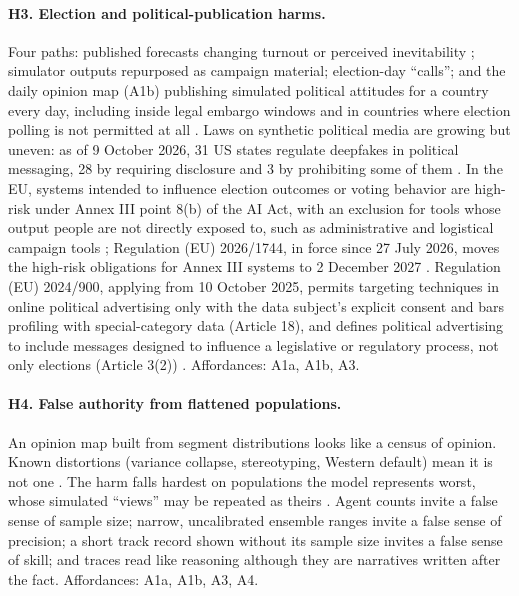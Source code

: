\documentclass[11pt]{article}
\begin{document}
\paragraph{H3. Election and political-publication harms.} Four paths: published forecasts changing turnout or perceived inevitability \citep{westwood2020projecting,perdomo2020performative,simon1954bandwagon}; simulator outputs repurposed as campaign material; election-day ``calls''; and the daily opinion map (A1b) publishing simulated political attitudes for a country every day, including inside legal embargo windows and in countries where election polling is not permitted at all \citep{esomarwapor2023}. Laws on synthetic political media are growing but uneven: as of 9 October 2026, 31 US states regulate deepfakes in political messaging, 28 by requiring disclosure and 3 by prohibiting some of them \citep{ncsl2026elections}. In the EU, systems intended to influence election outcomes or voting behavior are high-risk under Annex III point 8(b) of the AI Act, with an exclusion for tools whose output people are not directly exposed to, such as administrative and logistical campaign tools \citep{euaiact2024}; Regulation (EU) 2026/1744, in force since 27 July 2026, moves the high-risk obligations for Annex III systems to 2 December 2027 \citep{euomnibus2026}. Regulation (EU) 2024/900, applying from 10 October 2025, permits targeting techniques in online political advertising only with the data subject's explicit consent and bars profiling with special-category data (Article 18), and defines political advertising to include messages designed to influence a legislative or regulatory process, not only elections (Article 3(2)) \citep{eupoladv2024}. Affordances: A1a, A1b, A3.

\paragraph{H4. False authority from flattened populations.} An opinion map built from segment distributions looks like a census of opinion. Known distortions (variance collapse, stereotyping, Western default) mean it is not one \citep{bisbee2024synthetic,peng2025funhouse,tao2023cultural}. The harm falls hardest on populations the model represents worst, whose simulated ``views'' may be repeated as theirs \citep{wang2024misportray}. Agent counts invite a false sense of sample size; narrow, uncalibrated ensemble ranges invite a false sense of precision; a short track record shown without its sample size invites a false sense of skill; and traces read like reasoning although they are narratives written after the fact. Affordances: A1a, A1b, A3, A4.
\end{document}
